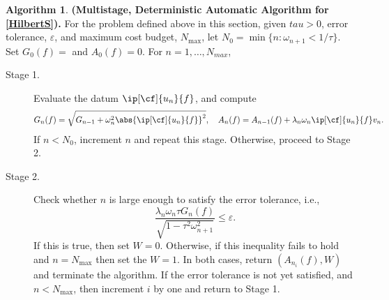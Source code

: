 \documentclass[final]{elsarticle}
\theoremstyle{definition}
\newtheorem{algo}{Algorithm}
\theoremstyle{remark}
\begin{document}
\begin{algo} \label{GenHilbAlg} {\bf (Multistage, Deterministic Automatic Algorithm for \eqref{HilbertS}).}  For the problem defined above in this section, given $tau>0$, error tolerance, $\varepsilon$, and maximum cost budget, $N_{\max}$, let $N_0= \min\{ n : \omega_{n+1} < 1 /\tau\}$. Set $G_0(f)=$ and $A_0(f)=0$.  For $n=1, \ldots, N_{max}$,

\begin{description}

\item [Stage 1.] Evaluate the datum $\ip[\cf]{u_n}{f}$, and compute  
\[
G_{n}(f)=\sqrt{G_{n-1} + \omega_n^2 \abs{\ip[\cf]{u_n}{f}}^2}, \quad A_n(f)=A_{n-1}(f)+ \lambda_n\omega_n\ip[\cf]{u_n}{f}v_n.
\]
If $n<N_0$, increment $n$ and repeat this stage.  Otherwise, proceed to Stage 2.

\item [Stage 2.] Check whether $n$ is large enough to satisfy the error tolerance, i.e., 
\[
\frac{\lambda_n \omega_n \tau G_{n}(f)}{\sqrt{1 - \tau^2 \omega_{n+1}^2}} \le \varepsilon.
\]
If this is true, then set $W=0$.  Otherwise, if this inequality fails to hold and $n= N_{\max}$ then set the $W=1$.  In both cases, return $(A_{n_i}(f),W)$ and terminate the algorithm.  If the error tolerance is not yet satisfied, and $n < N_{\max}$, then increment $i$ by one and return to Stage 1.
\end{description}
\end{algo}
\end{document}
